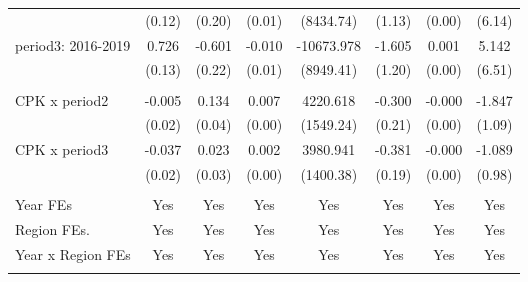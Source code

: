 \begin{landscape}
\begin{table}[H]
{\begin{tabular}{l*{7}{c}}
                    &      (0.12)         &      (0.20)         &      (0.01)         &   (8434.74)         &      (1.13)         &      (0.00)         &      (6.14)         \\
period3: 2016-2019            &       0.726\sym{***}&      -0.601\sym{**} &      -0.010         &  -10673.978         &      -1.605         &       0.001         &       5.142         \\
                    &      (0.13)         &      (0.22)         &      (0.01)         &   (8949.41)         &      (1.20)         &      (0.00)         &      (6.51)         \\
\\
CPK x period2          &      -0.005         &       0.134\sym{***}&       0.007\sym{***}&    4220.618\sym{**} &      -0.300         &      -0.000\sym{*}  &      -1.847         \\
                    &      (0.02)         &      (0.04)         &      (0.00)         &   (1549.24)         &      (0.21)         &      (0.00)         &      (1.09)         \\
CPK x period3          &      -0.037         &       0.023         &       0.002         &    3980.941\sym{**} &      -0.381\sym{*}  &      -0.000         &      -1.089         \\
                    &      (0.02)         &      (0.03)         &      (0.00)         &   (1400.38)         &      (0.19)         &      (0.00)         &      (0.98)         \\
\\
Year FEs                &       Yes       &     Yes        &     Yes        &     Yes     &      Yes        &    Yes         &     Yes         \\
Region FEs.           &       Yes       &     Yes        &     Yes        &     Yes     &      Yes        &    Yes         &     Yes         \\
Year x Region FEs &       Yes       &     Yes        &     Yes        &     Yes     &      Yes        &    Yes         &     Yes         \\
\\


\end{tabular}}
\end{table}
\end{landscape}

